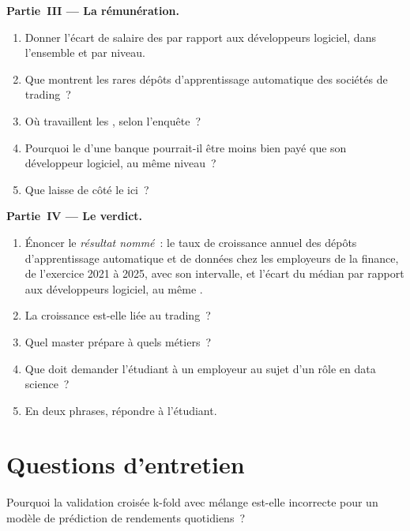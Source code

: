 \begin{problem}
\medskip\noindent\textbf{Partie~III --- La rémunération.}
\begin{enumerate}[resume]
\item Donner l'écart de salaire des  par rapport aux développeurs logiciel, dans l'ensemble et par niveau.
\item Que montrent les rares dépôts d'apprentissage automatique des sociétés de trading~?
\item Où travaillent les , selon l'enquête~?
\item Pourquoi le  d'une banque pourrait-il être moins bien payé que son développeur logiciel, au même niveau~?
\item Que laisse de côté le  ici~?
\end{enumerate}

\medskip\noindent\textbf{Partie~IV --- Le verdict.}
\begin{enumerate}[resume]
\item Énoncer le \emph{résultat nommé}~: le taux de croissance annuel des dépôts d'apprentissage automatique et de données chez les employeurs de la finance,
de l'exercice 2021 à 2025, avec son intervalle, et l'écart du  médian par rapport aux développeurs logiciel, au même .
\item La croissance est-elle liée au trading~?
\item Quel master prépare à quels métiers~?
\item Que doit demander l'étudiant à un employeur au sujet d'un rôle en data science~?
\item En deux phrases, répondre à l'étudiant.
\end{enumerate}
\end{problem}

\section{Questions d'entretien}

\begin{interviewq}\label{iq:in:machine-learning-and-data-engineer:1}
Pourquoi la validation croisée k-fold avec mélange est-elle incorrecte pour un modèle de prédiction de rendements quotidiens~?
\end{interviewq}


